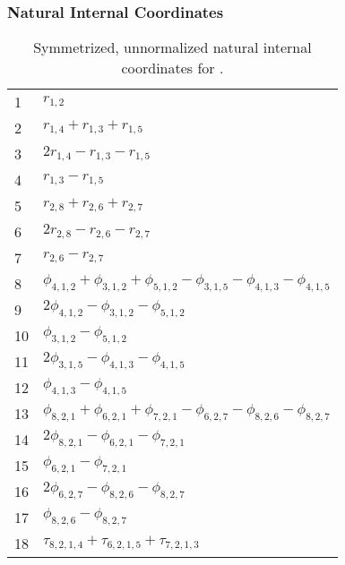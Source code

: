\documentclass[10pt,oneside]{article}
\begin{document}
\clearpage

\subsubsection*{Natural Internal Coordinates}
\begin{table}[h!]
\centering
\caption{Symmetrized, unnormalized natural internal coordinates for .}
\small
\begin{tabular}{ll}
  1   & $r_{1,2}$ \\
  2   & $r_{1,4} + r_{1,3} + r_{1,5}$ \\
  3   & $2r_{1,4} - r_{1,3} - r_{1,5}$ \\
  4   & $r_{1,3} - r_{1,5}$ \\
  5   & $r_{2,8} + r_{2,6} + r_{2,7}$ \\
  6   & $2r_{2,8} - r_{2,6} - r_{2,7}$ \\
  7   & $r_{2,6} - r_{2,7}$ \\
  8   & $\phi_{4,1,2} + \phi_{3,1,2} + \phi_{5,1,2} - \phi_{3,1,5} - \phi_{4,1,3} - \phi_{4,1,5}$ \\
  9   & $2\phi_{4,1,2} - \phi_{3,1,2} - \phi_{5,1,2}$ \\
  10  & $\phi_{3,1,2} - \phi_{5,1,2}$ \\
  11  & $2\phi_{3,1,5} - \phi_{4,1,3} - \phi_{4,1,5}$ \\
  12  & $\phi_{4,1,3} - \phi_{4,1,5}$ \\
  13  & $\phi_{8,2,1} + \phi_{6,2,1} + \phi_{7,2,1} - \phi_{6,2,7} - \phi_{8,2,6} - \phi_{8,2,7}$ \\
  14  & $2\phi_{8,2,1} - \phi_{6,2,1} - \phi_{7,2,1}$ \\
  15  & $\phi_{6,2,1} - \phi_{7,2,1}$ \\
  16  & $2\phi_{6,2,7} - \phi_{8,2,6} - \phi_{8,2,7}$ \\
  17  & $\phi_{8,2,6} - \phi_{8,2,7}$ \\
  18  & $\tau_{8,2,1,4} + \tau_{6,2,1,5} + \tau_{7,2,1,3}$ \\
\end{tabular}
\end{table}

\clearpage

\subsection{\ \ \ }
\end{document}
